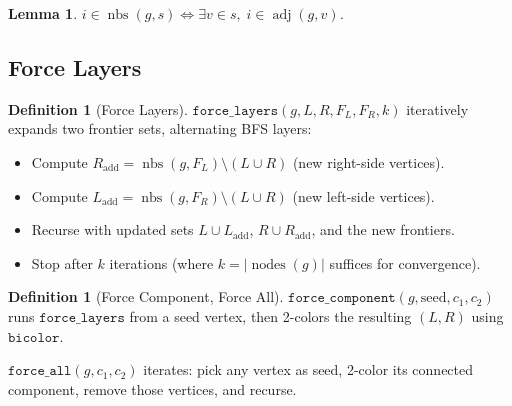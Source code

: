 \documentclass[11pt]{article}
\theoremstyle{plain}
\newtheorem{lemma}[theorem]{Lemma}
\theoremstyle{definition}
\newtheorem{definition}[theorem]{Definition}
\theoremstyle{remark}
\newcommand{\adj}{\operatorname{adj}}
\newcommand{\nodes}{\operatorname{nodes}}
\newcommand{\nbs}{\operatorname{nbs}}
\begin{document}
\begin{lemma}
\label{lem:nbs-spec}
$i \in \nbs(g, s) \iff \exists v \in s,\; i \in \adj(g, v)$.
\end{lemma}

\subsection{Force Layers}

\begin{definition}[Force Layers]
$\texttt{force\_layers}(g, L, R, F_L, F_R, k)$ iteratively expands two frontier sets, alternating BFS layers:
\begin{itemize}[nosep]
  \item Compute $R_{\text{add}} = \nbs(g, F_L) \setminus (L \cup R)$ (new right-side vertices).
  \item Compute $L_{\text{add}} = \nbs(g, F_R) \setminus (L \cup R)$ (new left-side vertices).
  \item Recurse with updated sets $L \cup L_{\text{add}}$, $R \cup R_{\text{add}}$, and the new frontiers.
  \item Stop after $k$ iterations (where $k = |\nodes(g)|$ suffices for convergence).
\end{itemize}
\end{definition}

\begin{definition}[Force Component, Force All]
$\texttt{force\_component}(g, \text{seed}, c_1, c_2)$ runs $\texttt{force\_layers}$ from a seed vertex, then 2-colors the resulting $(L, R)$ using $\texttt{bicolor}$.

$\texttt{force\_all}(g, c_1, c_2)$ iterates: pick any vertex as seed, 2-color its connected component, remove those vertices, and recurse.
\end{definition}
\end{document}
